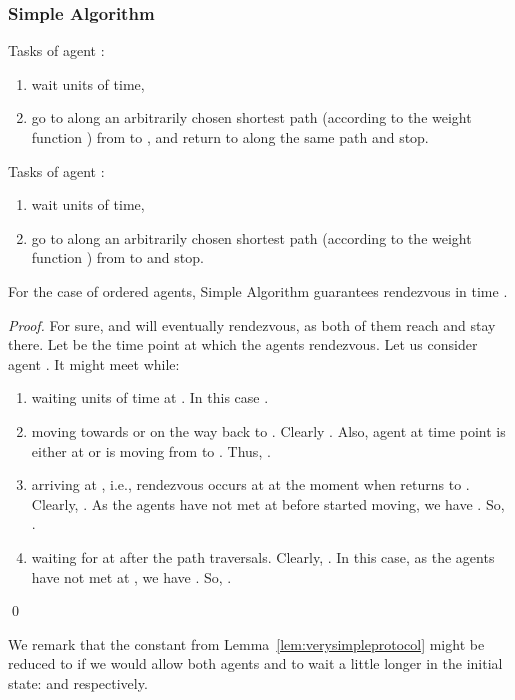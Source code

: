 \documentclass{llncs}
\newcommand{\simplealgorithm}{Simple Algorithm}
\begin{document}
\subsubsection*{\simplealgorithm}

Tasks of agent :
\begin{enumerate}
  \item wait  units of time,
  \item  go to  along an arbitrarily chosen shortest path (according to the weight function ) from  to , and return to  along the same path and stop.
\end{enumerate}
\noindent
Tasks of agent :
\begin{enumerate}
 \item  wait  units of time,
 \item go to  along an arbitrarily chosen shortest path (according to the weight function ) from  to  and stop.
\end{enumerate}


\begin{lemma} \label{lem:verysimpleprotocol}
For the case of ordered agents, {\simplealgorithm} guarantees rendezvous in time .
\end{lemma}
\begin{proof}	
For sure,  and  will eventually rendezvous, as both of them reach  and stay there.
Let  be the time point at which the agents rendezvous.
Let us consider agent . It might meet  while:
\begin{enumerate}
	\item waiting  units of time at . In this case .
	\item moving towards  or on the way back to .
              Clearly .
              Also, agent  at time point  is either at  or is moving from  to .
              Thus, .
	
	
	\item arriving at , i.e., rendezvous occurs at  at the moment when  returns to .
              Clearly, .
              As the agents have not met at  before  started moving, we have .
	      So, .

	\item waiting for  at  after the path traversals.
              Clearly, .
              In this case, as the agents have not met at , we have .
	      So, .
	
\end{enumerate}
\qed\end{proof}

We remark that the constant  from Lemma~\ref{lem:verysimpleprotocol} might be reduced to 
if we would allow both agents  and  to wait a little longer in the initial state:
 and  respectively.
\end{document}
